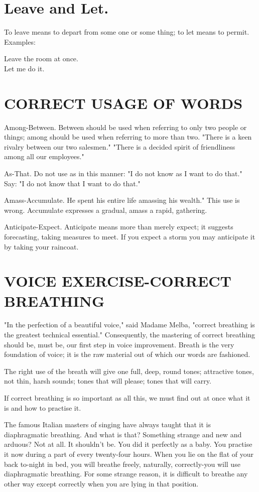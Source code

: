\documentclass[10pt]{article}
\begin{document}
\section*{Leave and Let.}
To leave means to depart from some one or some thing; to let means to permit. Examples:

Leave the room at once.\\
Let me do it.

\section*{CORRECT USAGE OF WORDS}
Among-Between. Between should be used when referring to only two people or things; among should be used when referring to more than two. "There is a keen rivalry between our two salesmen." "There is a decided spirit of friendliness among all our employees."

As-That. Do not use as in this manner: "I do not know as I want to do that." Say: "I do not know that I want to do that."

Amass-Accumulate. He spent his entire life amassing his wealth." This use is wrong. Accumulate expresses a gradual, amass a rapid, gathering.

Anticipate-Expect. Anticipate means more than merely expect; it suggests forecasting, taking measures to meet. If you expect a storm you may anticipate it by taking your raincoat.

\section*{VOICE EXERCISE-CORRECT BREATHING}
"In the perfection of a beautiful voice," said Madame Melba, "correct breathing is the greatest technical essential." Consequently, the mastering of correct breathing should be, must be, our first step in voice improvement. Breath is the very foundation of voice; it is the raw material out of which our words are fashioned.

The right use of the breath will give one full, deep, round tones; attractive tones, not thin, harsh sounds; tones that will please; tones that will carry.

If correct breathing is so important as all this, we must find out at once what it is and how to practise it.

The famous Italian masters of singing have always taught that it is diaphragmatic breathing. And what is that? Something strange and new and arduous? Not at all. It shouldn't be. You did it perfectly as a baby. You practise it now during a part of every twenty-four hours. When you lie on the flat of your back to-night in bed, you will breathe freely, naturally, correctly-you will use diaphragmatic breathing. For some strange reason, it is difficult to breathe any other way except correctly when you are lying in that position.
\end{document}
